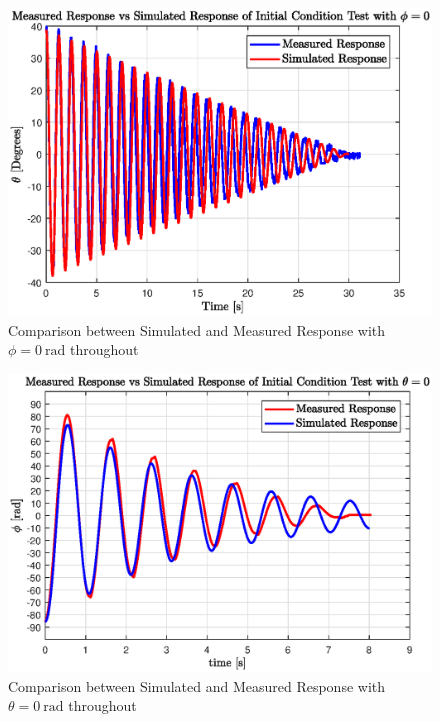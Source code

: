 \begin{figure}[h]
	\centering
	\includegraphics[scale=0.8]{./figs/sim_vs_measured_q1.eps}
	\caption{Comparison between Simulated and Measured Response with $\phi = \SI{0}{\radian}$ throughout}
	\label{fig:sim_vs_measured_q1}
\end{figure}

\begin{figure}[h]
	\centering
	\includegraphics[scale=0.8]{./figs/sim_vs_measured_q2.eps}
	\caption{Comparison between Simulated and Measured Response with $\theta = \SI{0}{\radian}$ throughout}
	\label{fig:sim_vs_measured_q2}
\end{figure}


